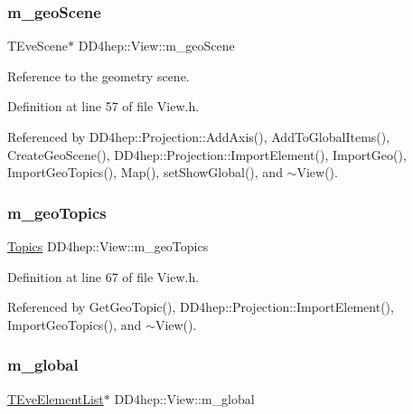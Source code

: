 \subsubsection{\texorpdfstring{m\+\_\+geo\+Scene}{m\_geoScene}}
{\footnotesize\ttfamily T\+Eve\+Scene$\ast$ D\+D4hep\+::\+View\+::m\+\_\+geo\+Scene\hspace{0.3cm}{\ttfamily [protected]}}



Reference to the geometry scene. 



Definition at line 57 of file View.\+h.



Referenced by D\+D4hep\+::\+Projection\+::\+Add\+Axis(), Add\+To\+Global\+Items(), Create\+Geo\+Scene(), D\+D4hep\+::\+Projection\+::\+Import\+Element(), Import\+Geo(), Import\+Geo\+Topics(), Map(), set\+Show\+Global(), and $\sim$\+View().

\hypertarget{class_d_d4hep_1_1_view_a43c344306103039f764355833cee51c7}{}\label{class_d_d4hep_1_1_view_a43c344306103039f764355833cee51c7} 
\subsubsection{\texorpdfstring{m\+\_\+geo\+Topics}{m\_geoTopics}}
{\footnotesize\ttfamily \hyperlink{class_d_d4hep_1_1_view_aac8510a8567e5e9128020fd81d8f57de}{Topics} D\+D4hep\+::\+View\+::m\+\_\+geo\+Topics\hspace{0.3cm}{\ttfamily [protected]}}



Definition at line 67 of file View.\+h.



Referenced by Get\+Geo\+Topic(), D\+D4hep\+::\+Projection\+::\+Import\+Element(), Import\+Geo\+Topics(), and $\sim$\+View().

\hypertarget{class_d_d4hep_1_1_view_a6faa3880d28177952c6aad166327397a}{}\label{class_d_d4hep_1_1_view_a6faa3880d28177952c6aad166327397a} 
\subsubsection{\texorpdfstring{m\+\_\+global}{m\_global}}
{\footnotesize\ttfamily \hyperlink{class_t_eve_element_list}{T\+Eve\+Element\+List}$\ast$ D\+D4hep\+::\+View\+::m\+\_\+global\hspace{0.3cm}{\ttfamily [protected]}}



